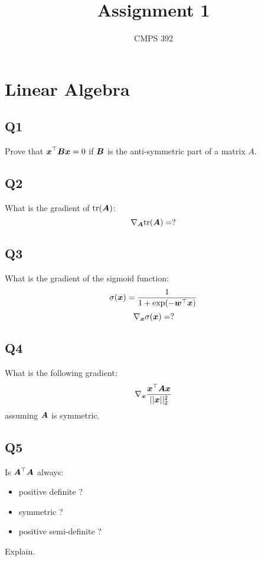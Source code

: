\documentclass[11pt,oneside,a4paper]{article}
\title{Assignment 1}
\author{CMPS 392}
\date{}
\theoremstyle{definition}
\DeclareRobustCommand{\[}{\begin{equation}}
\DeclareRobustCommand{\]}{\end{equation}}
\begin{document}
\setlength{\parskip}{0.25 \baselineskip}
\newlength{\figwidth}
\setlength{\figwidth}{26pc}
\newlength{\notationgap}
\setlength{\notationgap}{1pc}



\maketitle

%  
%  

\section*{Linear Algebra} 
\subsection*{Q1}
Prove that $\displaystyle {\bm{x}}^\top {\bm{B}} {\bm{x}} = 0 $ if ${\bm{B}}$ is the anti-symmetric part of a matrix $A$. 

\subsection*{Q2}
What is the gradient of $\mathrm{tr}({\bm{A}})$: \\
$$ \nabla_{{\bm{A}}} \mathrm{tr}({\bm{A}})=?$$

\subsection*{Q3}
What is the gradient of the sigmoid function: 
$$\sigma({\bm{x}}) = \frac{1}{1+\exp(-{\bm{w}}^\top {\bm{x}})}$$
$$ \nabla_{{\bm{x}}} \sigma({\bm{x}})=?$$

\subsection*{Q4} 
What is the following gradient: 
$$ \nabla_{{\bm{x}}} \frac{{\bm{x}}^\top {\bm{A}} {\bm{x}}}{|| {\bm{x}} ||_2^2}$$
assuming ${\bm{A}}$ is symmetric.

\subsection*{Q5}
Is ${\bm{A}}^\top {\bm{A}}$ always: 
\begin{itemize}
    \item positive definite ? 
    \item symmetric ?
    \item positive semi-definite ? 
\end{itemize}
Explain.
\end{document}
